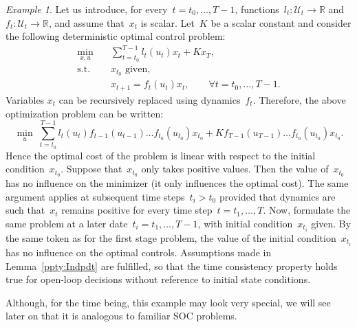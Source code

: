 \documentclass[a4paper]{amsart}
\theoremstyle{plain}
\theoremstyle{definition}
\theoremstyle{remark}
\newtheorem{example}{Example}
\begin{document}
\begin{example} \label{ex:Det}
Let us introduce, for every~$t=t_0, \dots, T-1$, functions~$l_t:
\mathcal{U}_t \rightarrow \mathbb{R}$ and~$f_t: \mathcal{U}_t
\rightarrow \mathbb{R}$, and assume that~$x_t$ is scalar. Let~$K$
be a scalar constant and consider the following deterministic
optimal control problem:
\begin{align*}
\min_{x, u} \quad& \sum_{t=t_0}^{T-1} l_t\left(u_t\right) x_t  +
K x_T, \\
\text{s.t.} \quad& x_{t_0} \text{ given}, \\
& x_{t+1} = f_t\left(u_t\right) x_t, \qquad \forall t=t_0, \dots,
T-1.
\end{align*}
Variables $x_t$ can be recursively replaced using dynamics~$f_t$.
Therefore, the above optimization problem can be written:
\begin{equation*}
\min_{u} \; \sum_{t=t_0}^{T-1} l_t\left(u_t\right)
f_{t-1}\left(u_{t-1}\right) \ldots f_{t_0}\left(u_{t_0}\right)
x_{t_0} + K f_{T-1}\left(u_{T-1}\right) \ldots f_{t_0}
\left(u_{t_0}\right) x_{t_0}.
\end{equation*}
Hence the optimal cost of the problem is linear with respect to
the initial condition~$x_{t_0}$. Suppose that~$x_{t_0}$ only takes
positive values. Then the value of~$x_{t_0}$ has no influence on
the minimizer (it only influences the optimal cost). The same
argument applies at subsequent time steps~$t_i>t_0$ provided that
dynamics are such that~$x_t$ remains positive for every time
step~$t=t_1, \dots, T$. Now, formulate the same problem at a later
date~$t_i=t_1, \dots, T-1$, with initial condition~$x_{t_i}$
given. By the same token as for the first stage problem, the value
of the initial condition~$x_{t_i}$ has no influence on the optimal
controls. Assumptions made in Lemma~\ref{ppty:Indpdt} are
fulfilled, so that the time consistency property holds true for
open-loop decisions without reference to initial state conditions.

Although, for the time being, this example may look very special,
we will see later on that it is analogous to familiar SOC
problems.
\end{example}
\end{document}
